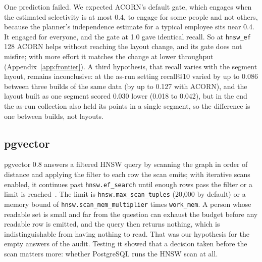 One prediction failed. We expected ACORN's default gate, which engages when the estimated
selectivity is at most 0.4, to engage for some people and not others, because the planner's
independence estimate for a typical employee sits near 0.4. It engaged for everyone, and the gate
at 1.0 gave identical recall. So at \texttt{hnsw\_ef} 128 ACORN helps without reaching the layout change, and its gate does not misfire; with more effort it matches the change at lower throughput (Appendix~\ref{app:frontier}). A third hypothesis, that recall varies with the segment
layout, remains inconclusive: at the as-run setting recall@10 varied by up to 0.086 between three
builds of the same data (by up to 0.127 with ACORN),
and the layout built as one segment scored 0.030 lower (0.018 to 0.042), but in the end the as-run
collection also held its points in a single segment, so the difference is one between builds, not
layouts.

\subsection{pgvector}\label{app:pgvector}

pgvector 0.8 answers a filtered HNSW query by scanning the graph in order of distance and applying
the filter to each row the scan emits; with iterative scans enabled, it continues past
\texttt{hnsw.ef\_search} until enough rows pass the filter or a limit is
reached~\cite{pgvector2026pgvector}. The limit is \texttt{hnsw.max\_scan\_tuples} (20,000 by default)
or a memory bound of \texttt{hnsw.scan\_mem\_multiplier} times \texttt{work\_mem}. A person whose
readable set is small and far from the question can exhaust the budget before any readable row is
emitted, and the query then returns nothing, which is indistinguishable from having nothing to read.
That was our hypothesis for the empty answers of the audit. Testing it showed that a decision taken
before the scan matters more: whether PostgreSQL runs the HNSW scan at all.

